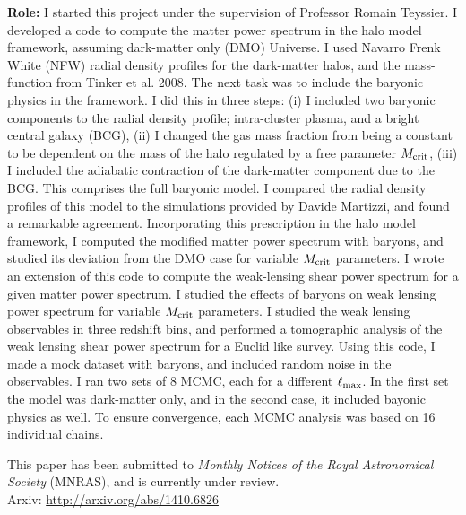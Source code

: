 {\bf Role:} I started this project under the supervision of Professor Romain Teyssier. 
I developed a code to compute the matter power spectrum
in the halo model framework, assuming dark-matter only (DMO) Universe. 
I used Navarro Frenk White (NFW) radial density profiles for the 
dark-matter halos, and the mass-function from 
Tinker et al. 2008. The next task was to include the baryonic
physics in the framework. 
I did this in three steps: (i) I included two baryonic components
to the radial density profile; intra-cluster plasma, 
and a bright central galaxy (BCG), (ii) I changed 
the gas mass fraction from being a constant to be dependent on the mass
of the halo regulated by a free parameter $M_{\rm crit}$, (iii)
I included the adiabatic contraction of the dark-matter component
due to the BCG. This comprises the full baryonic
model. I compared the radial density profiles of this model
to the simulations provided by Davide Martizzi, and found 
a remarkable agreement. 
Incorporating this prescription in the halo model framework, I computed
the modified matter power spectrum with baryons, and studied its
deviation from the DMO case for variable 
$M_{\rm crit}$ parameters.  
I wrote an extension of this code to compute the weak-lensing
shear power spectrum for a given matter power spectrum. I studied
the effects of baryons on weak lensing power spectrum
for variable $M_{\rm crit}$ parameters. I studied the weak lensing
observables in three redshift bins, and performed a tomographic 
analysis of the weak lensing shear power spectrum for a Euclid like
survey. Using this code, I made a mock dataset with baryons, and included
random noise in the observables.
I ran two sets of 8 MCMC, each for a different $\ell_{\rm max}$.
In the first
set the model was dark-matter only, and in the second case, it included
bayonic physics as well. 
To ensure convergence, each MCMC analysis was based on  
16 individual chains. 

This paper has been submitted to {\it Monthly Notices of the Royal Astronomical
Society} (MNRAS), and is currently under review.
\\
Arxiv: \url{http://arxiv.org/abs/1410.6826}

\clearpage
